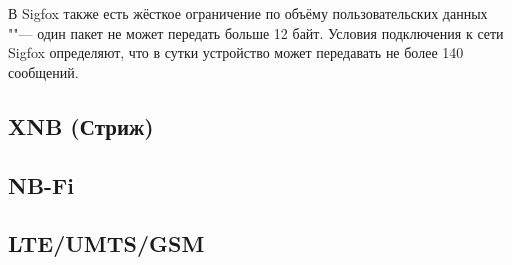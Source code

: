 В Sigfox также есть жёсткое ограничение по объёму пользовательских данных ""--- 
один пакет не может передать больше 12 байт.
Условия подключения к сети Sigfox определяют, что в сутки устройство может 
передавать не более 140 сообщений.



\subsection{XNB (Стриж)}

\subsection{NB-Fi}

\subsection{LTE/UMTS/GSM}






